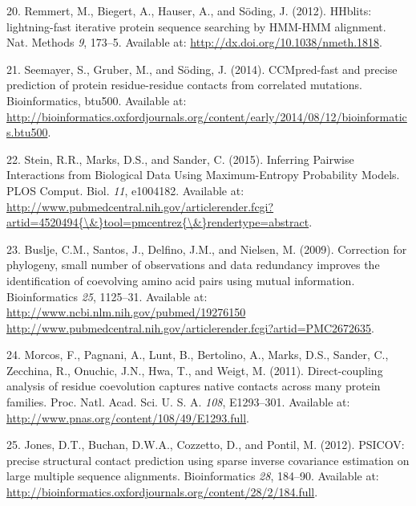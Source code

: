 \documentclass[12pt,a4paper,twoside]{book}
\theoremstyle{definition}
\theoremstyle{definition}
\theoremstyle{remark}
\begin{document}
\hypertarget{ref-Remmert2012}{}
20. Remmert, M., Biegert, A., Hauser, A., and Söding, J. (2012).
HHblits: lightning-fast iterative protein sequence searching by HMM-HMM
alignment. Nat. Methods \emph{9}, 173--5. Available at:
\url{http://dx.doi.org/10.1038/nmeth.1818}.

\hypertarget{ref-Seemayer2014}{}
21. Seemayer, S., Gruber, M., and Söding, J. (2014). CCMpred-fast and
precise prediction of protein residue-residue contacts from correlated
mutations. Bioinformatics, btu500. Available at:
\url{http://bioinformatics.oxfordjournals.org/content/early/2014/08/12/bioinformatics.btu500}.

\hypertarget{ref-Stein2015a}{}
22. Stein, R.R., Marks, D.S., and Sander, C. (2015). Inferring Pairwise
Interactions from Biological Data Using Maximum-Entropy Probability
Models. PLOS Comput. Biol. \emph{11}, e1004182. Available at:
\href{http://www.pubmedcentral.nih.gov/articlerender.fcgi?artid=4520494\%7B/\&\%7Dtool=pmcentrez\%7B/\&\%7Drendertype=abstract}{http://www.pubmedcentral.nih.gov/articlerender.fcgi?artid=4520494\{\textbackslash{}\&\}tool=pmcentrez\{\textbackslash{}\&\}rendertype=abstract}.

\hypertarget{ref-Buslje2009}{}
23. Buslje, C.M., Santos, J., Delfino, J.M., and Nielsen, M. (2009).
Correction for phylogeny, small number of observations and data
redundancy improves the identification of coevolving amino acid pairs
using mutual information. Bioinformatics \emph{25}, 1125--31. Available
at:
\href{http://www.ncbi.nlm.nih.gov/pubmed/19276150\%20http://www.pubmedcentral.nih.gov/articlerender.fcgi?artid=PMC2672635}{http://www.ncbi.nlm.nih.gov/pubmed/19276150 http://www.pubmedcentral.nih.gov/articlerender.fcgi?artid=PMC2672635}.

\hypertarget{ref-Morcos2011}{}
24. Morcos, F., Pagnani, A., Lunt, B., Bertolino, A., Marks, D.S.,
Sander, C., Zecchina, R., Onuchic, J.N., Hwa, T., and Weigt, M. (2011).
Direct-coupling analysis of residue coevolution captures native contacts
across many protein families. Proc. Natl. Acad. Sci. U. S. A.
\emph{108}, E1293--301. Available at:
\url{http://www.pnas.org/content/108/49/E1293.full}.

\hypertarget{ref-Jones2012}{}
25. Jones, D.T., Buchan, D.W.A., Cozzetto, D., and Pontil, M. (2012).
PSICOV: precise structural contact prediction using sparse inverse
covariance estimation on large multiple sequence alignments.
Bioinformatics \emph{28}, 184--90. Available at:
\url{http://bioinformatics.oxfordjournals.org/content/28/2/184.full}.
\end{document}
